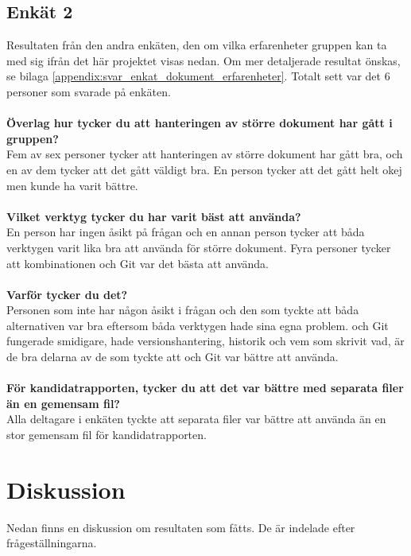 \subsection{Enkät 2}
Resultaten från den andra enkäten, den om vilka erfarenheter gruppen kan ta med sig ifrån det här projektet visas nedan. Om mer detaljerade resultat önskas, se bilaga \ref{appendix:svar_enkat_dokument_erfarenheter}. Totalt sett var det 6 personer som svarade på enkäten.\\\\
\textbf{Överlag hur tycker du att hanteringen av större dokument har gått i gruppen?}\\
Fem av sex personer tycker att hanteringen av större dokument har gått bra, och en av dem tycker att det gått väldigt bra. En person tycker att det gått helt okej men kunde ha varit bättre.\\\\
\textbf{Vilket verktyg tycker du har varit bäst att använda?}\\
En person har ingen åsikt på frågan och en annan person tycker att båda verktygen varit lika bra att använda för större dokument. Fyra personer tycker att kombinationen \latex och Git var det bästa att använda.\\\\
\textbf{Varför tycker du det?}\\
Personen som inte har någon åsikt i frågan och den som tyckte att båda alternativen var bra eftersom båda verktygen hade sina egna problem. \latex och Git fungerade smidigare, hade versionshantering, historik och vem som skrivit vad, är de bra delarna av de som tyckte att \latex och Git var bättre att använda.\\\\
\textbf{För kandidatrapporten, tycker du att det var bättre med separata filer än en gemensam fil?}\\
Alla deltagare i enkäten tyckte att separata filer var bättre att använda än en stor gemensam fil för kandidatrapporten.

\section{Diskussion}
\label{sec:discussion-tuhkala}
Nedan finns en diskussion om resultaten som fåtts. De är indelade efter frågeställningarna.

